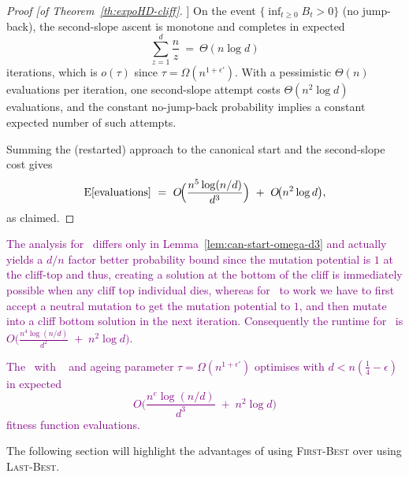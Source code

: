 \begin{proof}[Proof [of Theorem~\ref{th:expoHD-cliff}]]
	\smallskip
	On the event $\{\inf_{t\ge 0} B_t>0\}$ (no jump-back), the second-slope ascent is monotone and completes in expected
	\[
	\sum_{z=1}^{d}\frac{n}{z}\ =\ \Theta(n\log d)
	\]
	iterations, which is $o(\tau)$ since $\tau=\Omega(n^{1+\epsilon'})$. With a pessimistic $\Theta(n)$ evaluations per iteration, one second-slope attempt costs $\Theta(n^{2}\log d)$ evaluations, and the constant no-jump-back probability implies a constant expected number of such attempts.
	
	\smallskip

	Summing the (restarted) approach to the canonical start and the second-slope cost gives
	\[
	\text{E}[\text{evaluations}]
	\ =\ O\!\Big(\frac{n^{5}\log(n/d)}{d^{3}}\Big)\ +\ O\!\big(n^{2}\log d\big),
	\]
	as claimed.
\end{proof}

\textcolor{purple}{The analysis for \lastBest~differs only in Lemma~\ref{lem:can-start-omega-d3} and actually yields a $d/n$ factor better probability bound since the mutation potential is $1$ at the cliff-top and thus, creating a solution at the bottom of the cliff is immediately possible when any cliff top individual dies, whereas for \firstBest~to work we have to first accept a neutral mutation to get the mutation potential to $1$, and then mutate into a cliff bottom solution in the next iteration. Consequently the runtime for \lastBest~is  
$O\!\Big(\frac{n^{4}\log(n/d)}{d^{2}} \;+\; n^{2}\log d\Big)$.}

\textcolor{purple}{
\begin{corollary}
	The %
	\textcolor{purple}{\lastBest~with} \linHD\  and ageing parameter $\tau=\Omega(n^{1+\epsilon'})$
	optimises \cliff{} with $d<n(\tfrac{1}{4}-\epsilon)$ in expected
	\[
	O\!\Big(\frac{n^{e}\log(n/d)}{d^{3}} \;+\; n^{2}\log d\Big)
	\]
	fitness function evaluations.
\end{corollary}
}
The following section will highlight the advantages of using \textsc{First-Best} over using \textsc{Last-Best}.

